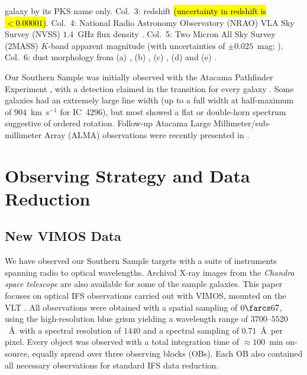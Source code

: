 \documentclass[a4paper,fleqn,usenatbib]{mnras}
\DeclareRobustCommand{\added}[1]{{\sethlcolor{green}\hl{#1}}}
\begin{document}
\begin{table}[t]
\begin{center}
{      galaxy by its PKS name only. Col.~3: redshift \added{(uncertainty in redshift is $< 0.00001$)}. Col.~4: National
      Radio Astronomy Observatory (NRAO) VLA Sky Survey (NVSS)
      $1.4$~GHz flux density \citep{Condon1998}. Col.~5: Two Micron
      All Sky Survey (2MASS) $K$-band apparent magnitude (with
      uncertainties of $\pm0.025$~mag;
      \citealt{Skrutskie2006}). Col.~6: dust morphology from (a)
      \citet{Govoni2000}, (b) \citet{Lauer2005}, (c)
      \citet{Bettoni2001}, (d) \citet{Sandage1979} and (e)
      \citet{Colbert2001}.}
  \end{center}
\end{table}

Our Southern Sample was initially observed with the Atacama Pathfinder
Experiment \citep[APEX; ][]{Gusten2006}, with a detection claimed in
the  transition for every galaxy
\citep{Prandoni2012}. Some galaxies had an extremely large line width
(up to a full width at half-maximum of $904$~km~s$^{-1}$ for IC~4296),
but most showed a flat or double-horn spectrum suggestive of ordered
rotation. Follow-up Atacama Large Millimeter/sub-millimeter Array
(ALMA) observations were recently presented in \citet{ruffa2019,
  ruffa2020}.

\section{Observing Strategy and Data Reduction}
\label{sec:obs}

\subsection{New VIMOS Data}
\label{subsec:VIMOS}

We have observed our Southern Sample targets with a suite of
instruments spanning radio to optical wavelengths. Archival X-ray
images from the \textit{Chandra space telescope} are also available
for some of the sample galaxies. This paper focuses on optical IFS
observations carried out with VIMOS, mounted on the VLT
\citep{LeFevre2003}. All observations were obtained with a spatial
sampling of $0\farcs67$, using the high-resolution blue grism yielding
a wavelength range of $3700$--$5520$~\AA\ with a spectral resolution
of $1440$ and a spectral sampling of $0.71$~\AA\ per pixel. Every
object was observed with a total integration time of $\approx100$~min
on-source, equally spread over three observing blocks (OBs). Each OB
also contained all necessary observations for standard IFS data
reduction.
\end{document}
